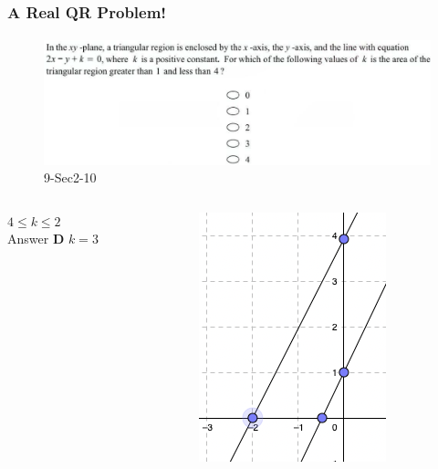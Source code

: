 \documentclass[
	11pt, %
	handout,
]{beamer}
\begin{document}
\begin{frame}
	\frametitle{A Real QR Problem!}
	\framesubtitle{}
	\begin{figure}
		\includegraphics[width=\linewidth]{Graphing_Linear_Equations_Example_Question2.png}
		\caption{9-Sec2-10}
	\end{figure}

	\begin{columns}[t] 
		\begin{column}{0.45\textwidth} %
			\pause
			$4\leq k \leq 2$\\
			\pause
			\bigskip
			Answer \textbf{D} $k=3$ 
		\end{column}
		\begin{column}{0.2\textwidth} %
			\begin{figure}
				\includegraphics[width=0.5\linewidth]{Graphing_Linear_Equations_Example_Question2_1.png}
			\end{figure}
    \end{column}
	\end{columns}
\end{frame}

\end{document}
